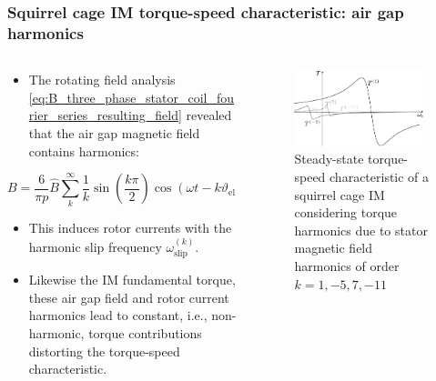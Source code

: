 \begin{frame}
	\frametitle{Squirrel cage IM torque-speed characteristic: air gap harmonics}
    \begin{columns}
		\begin{column}{0.45\textwidth}
	      \begin{itemize}
            \item The rotating field analysis \eqref{eq:B_three_phase_stator_coil_fourier_series_resulting_field} revealed that the air gap magnetic field contains harmonics:
          \end{itemize}
          $$
          B = \frac{6}{\pi p} \hat{B} \sum_{k}^{\infty} \frac{1}{k} \sin\left(\frac{k \pi}{2}\right) \cos(\omega t - k \vartheta_\mathrm{el}) 
          $$
          \begin{itemize}
            \item This induces rotor currents with the harmonic slip frequency $\omega^{(k)}_\mathrm{slip}$.
            \item Likewise the IM fundamental torque, these air gap field and rotor current harmonics lead to constant, i.e., non-harmonic, torque contributions distorting the torque-speed characteristic.
          \end{itemize}
        \end{column}
        \begin{column}{0.555\textwidth}
            \begin{figure}
                \centering
                \includegraphics[width=0.95\textwidth]{fig/lec06/Kloss_formula_harmonics.pdf}
                \caption{Steady-state torque-speed characteristic of a squirrel cage IM considering torque harmonics due to stator magnetic field harmonics of order $k=1,-5,7,-11$} 
                \label{fig:Kloss_formula_different_excitation_frequencies_field_weakening}
            \end{figure}
        \end{column}
    \end{columns}
\end{frame}